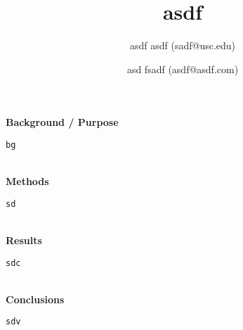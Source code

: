 \documentclass[11pt]{article}
\title{\vspace{-1cm}asdf
}
\author[]{asdf asdf (sadf@usc.edu)}\author[]{asd fsadf (asdf@asdf.com)}
\affil[]{}
\date{}
\begin{document}
\maketitle
\thispagestyle{fancyfirst}
{\bfseries\large Background / Purpose}
\begin{lstlisting}[mathescape]
bg
\end{lstlisting}
\hfill \\
{\bfseries\large Methods}
\begin{lstlisting}[mathescape]
sd
\end{lstlisting}
\hfill \\
{\bfseries\large Results}
\begin{lstlisting}[mathescape]
sdc
\end{lstlisting}
\hfill \\
{\bfseries\large Conclusions}
\begin{lstlisting}[mathescape]
sdv
\end{lstlisting}
\hfill \\
\end{document}
